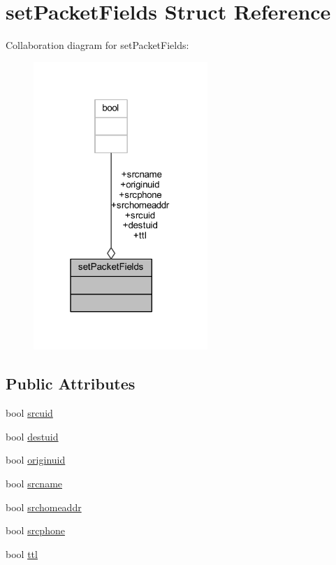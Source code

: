 \hypertarget{structset_packet_fields}{}\section{set\+Packet\+Fields Struct Reference}
\label{structset_packet_fields}


Collaboration diagram for set\+Packet\+Fields\+:
\nopagebreak
\begin{figure}[H]
\begin{center}
\leavevmode
\includegraphics[width=187pt]{structset_packet_fields__coll__graph}
\end{center}
\end{figure}
\subsection*{Public Attributes}
\begin{DoxyCompactItemize}
\item 
bool \hyperlink{structset_packet_fields_a09e5a2e16205b8b6222913317983575b}{srcuid}
\item 
bool \hyperlink{structset_packet_fields_a78f4fb2c908993b9dd61b87ad9ff4a8d}{destuid}
\item 
bool \hyperlink{structset_packet_fields_a93ee67a22b4ba82b1357fbf32009b4a5}{originuid}
\item 
bool \hyperlink{structset_packet_fields_afa29402b869dcbec7ede0068c6b29447}{srcname}
\item 
bool \hyperlink{structset_packet_fields_a7cfb8612f1c81e2bc2ef1e90e577e8a8}{srchomeaddr}
\item 
bool \hyperlink{structset_packet_fields_ae60b89f035169cd91e1fa56bf7114d98}{srcphone}
\item 
bool \hyperlink{structset_packet_fields_a5f55df686bff2c7831b881c7562d0f15}{ttl}
\end{DoxyCompactItemize}


